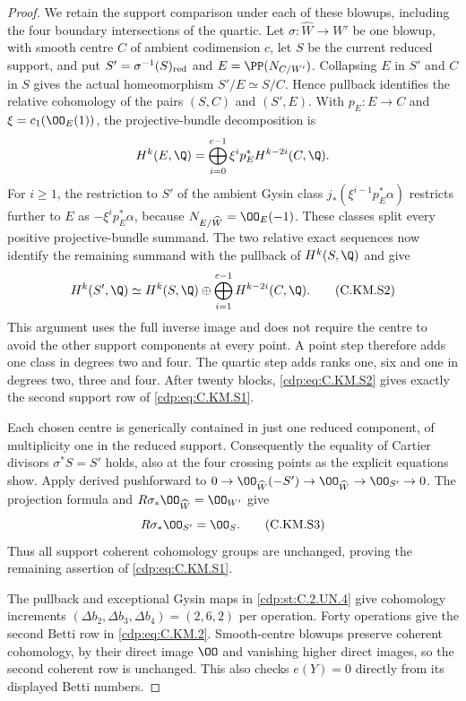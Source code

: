 \begin{proof}
We retain the support comparison under each of these blowups,
including the four boundary intersections of the quartic.
Let $\sigma:\widehat W\to W'$ be one blowup, with smooth
centre $C$ of ambient codimension $c$, let $S$ be the current
reduced support, and put $S'=\sigma^{-1}(S)_{\rm red}$ and
$E=\PP(N_{C/W'})$. Collapsing $E$ in $S'$ and $C$ in $S$
gives the actual homeomorphism $S'/E\simeq S/C$.
Hence pullback identifies the relative cohomology of the
pairs $(S,C)$ and $(S',E)$. With $p_E:E\to C$ and
$\xi=c_1(\OO_E(1))$, the projective-bundle decomposition is
\[
 H^k(E,\Q)=\bigoplus_{i=0}^{c-1}
                \xi^i p_E^*H^{k-2i}(C,\Q).
\]
For $i\ge1$, the restriction to $S'$ of the ambient Gysin
class $j_*(\xi^{i-1}p_E^*\alpha)$ restricts further to $E$
as $-\xi^i p_E^*\alpha$, because $N_{E/\widehat W}=\OO_E(-1)$.
These classes split every positive projective-bundle summand.
The two relative exact sequences now identify the remaining
summand with the pullback of $H^k(S,\Q)$ and give
\[
 H^k(S',\Q)\simeq H^k(S,\Q)\oplus
                \bigoplus_{i=1}^{c-1}H^{k-2i}(C,\Q).
                                                        \tag{C.KM.S2}\label{cdp:eq:C.KM.S2}
\]
This argument uses the full inverse image and does not require
the centre to avoid the other support components at every point.
A point step therefore adds one class in degrees two and four.
The quartic step adds ranks one, six and one in degrees two,
three and four. After twenty blocks, \eqref{cdp:eq:C.KM.S2} gives exactly
the second support row of \eqref{cdp:eq:C.KM.S1}.

Each chosen centre is generically contained in just one
reduced component, of multiplicity one in the reduced support.
Consequently the equality of Cartier divisors
$\sigma^*S=S'$ holds, also at the four crossing points as
the explicit equations show. Apply derived pushforward to
$0\to\OO_{\widehat W}(-S')\to\OO_{\widehat W}\to
\OO_{S'}\to0$. The projection formula and
$R\sigma_*\OO_{\widehat W}=\OO_{W'}$ give
\[
                         R\sigma_*\OO_{S'}=\OO_S.       \tag{C.KM.S3}\label{cdp:eq:C.KM.S3}
\]
Thus all support coherent cohomology groups are unchanged,
proving the remaining assertion of \eqref{cdp:eq:C.KM.S1}.

The pullback and exceptional Gysin maps in \ref{cdp:st:C.2.UN.4}
give cohomology increments $(\Delta b_2,\Delta b_3,
\Delta b_4)=(2,6,2)$ per operation. Forty operations
give the second Betti row in \eqref{cdp:eq:C.KM.2}. Smooth-centre
blowups preserve coherent cohomology, by their direct
image $\OO$ and vanishing higher direct images, so
the second coherent row is unchanged. This also checks
$e(Y)=0$ directly from its displayed Betti numbers.


\end{proof}
